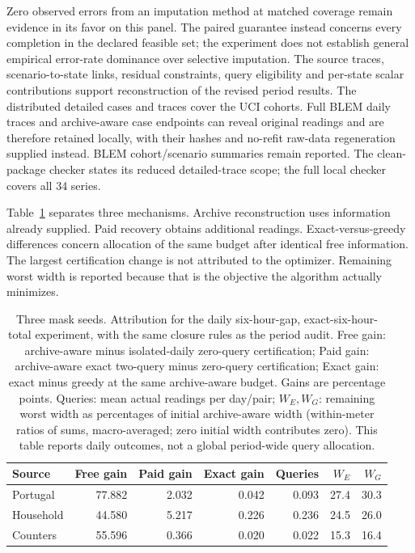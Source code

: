 \documentclass[12pt]{article}
\begin{document}
Zero observed errors from an imputation method at matched coverage remain
evidence in its favor on this panel. The paired guarantee instead concerns
every completion in the declared feasible set; the experiment does not
establish general empirical error-rate dominance over selective imputation.
The source traces, scenario-to-state links, residual constraints, query
eligibility and per-state scalar contributions support reconstruction of
the revised period results. The distributed detailed cases and traces
cover the UCI cohorts. Full BLEM daily traces and archive-aware case
endpoints can reveal original readings and are therefore retained locally,
with their hashes and no-refit raw-data regeneration supplied instead.
BLEM cohort/scenario summaries remain reported. The clean-package checker
states its reduced detailed-trace scope; the full local checker covers
all 34 series.

Table~\ref{tab:recovery-attribution} separates three mechanisms. Archive
reconstruction uses information already supplied. Paid recovery obtains
additional readings. Exact-versus-greedy differences concern allocation of
the same budget after identical free information. The largest certification
change is not attributed to the optimizer. Remaining worst width is
reported because that is the objective the algorithm actually minimizes.
\begin{table}[htbp]
\centering\normalsize\setlength{\tabcolsep}{4pt}
\caption{Three mask seeds. Attribution for the daily six-hour-gap, exact-six-hour-total experiment, with the same closure rules as the period audit. Free gain: archive-aware minus isolated-daily zero-query certification; Paid gain: archive-aware exact two-query minus zero-query certification; Exact gain: exact minus greedy at the same archive-aware budget. Gains are percentage points. Queries: mean actual readings per day/pair; $W_E,W_G$: remaining worst width as percentages of initial archive-aware width (within-meter ratios of sums, macro-averaged; zero initial width contributes zero). This table reports daily outcomes, not a global period-wide query allocation.}
\label{tab:recovery-attribution}
\begin{tabular}{lrrrrrr}
\toprule
Source & Free gain & Paid gain & Exact gain & Queries & $W_E$ & $W_G$\\
\midrule
Portugal & 77.882 & 2.032 & 0.042 & 0.093 & 27.4 & 30.3\\
Household & 44.580 & 5.217 & 0.226 & 0.236 & 24.5 & 26.0\\
Counters & 55.596 & 0.366 & 0.020 & 0.022 & 15.3 & 16.4\\
\bottomrule
\end{tabular}
\end{table}
\end{document}

